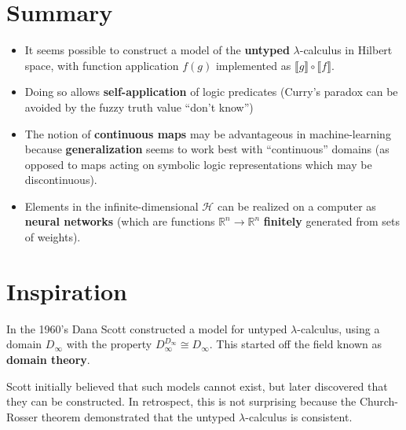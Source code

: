 \maketitle

\section*{Summary}
\begin{itemize}
	\item It seems possible to construct a model of the \textbf{untyped} $\lambda$-calculus in Hilbert space, with function application $f(g)$ implemented as $\llbracket g \rrbracket \circ \llbracket f \rrbracket$.
	
	\item Doing so allows \textbf{self-application} of logic predicates (Curry's paradox can be avoided by the fuzzy truth value ``don't know'')
	
	\item The notion of \textbf{continuous maps} may be advantageous in machine-learning because \textbf{generalization} seems to work best with ``continuous'' domains (as opposed to maps acting on symbolic logic representations which may be discontinuous).

	\item Elements in the infinite-dimensional $\mathcal{H}$ can be realized on a computer as \textbf{neural networks} (which are functions $\mathbb{R}^n \rightarrow \mathbb{R}^n$ \textbf{finitely} generated from sets of weights).
\end{itemize}


\setcounter{section}{-1}
\section{Inspiration}

In the 1960's Dana Scott constructed a model for untyped $\lambda$-calculus, using a domain $D_{\infty}$ with the property $D_{\infty}^{D_{\infty}} \cong D_{\infty}$.  This started off the field known as \textbf{domain theory}.

Scott initially believed that such models cannot exist, but later discovered that they can be constructed.  In retrospect, this is not surprising because the Church-Rosser theorem demonstrated that the untyped $\lambda$-calculus is consistent.

